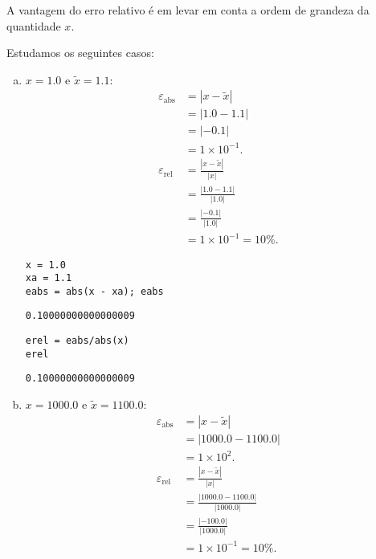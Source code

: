 A vantagem do erro relativo é em levar em conta a ordem de grandeza da quantidade $x$.

\begin{ex}\label{ex:medidas_de_erros}
  Estudamos os seguintes casos:
  \begin{enumerate}[a)]
  \item $x=1.0$ e $\tilde{x} = 1.1$:
    \begin{align}
      \varepsilon_{\text{abs}} &= |x - \tilde{x}| \\
                        &= |1.0 - 1.1|\\
                        &= |-0.1|\\
                        &= 1\times 10^{-1}.\\
      \varepsilon_{\text{rel}} &= \frac{|x - \tilde{x}|}{|x|} \\
                        &= \frac{|1.0-1.1|}{|1.0|}\\
                        &= \frac{|-0.1|}{|1.0|}\\
                        &= 1\times 10^{-1} = 10\%.
    \end{align}
    
\begin{lstlisting}
x = 1.0
xa = 1.1
eabs = abs(x - xa); eabs
\end{lstlisting}

\begin{verbatim}
0.10000000000000009
\end{verbatim}

\begin{lstlisting}
erel = eabs/abs(x)
erel
\end{lstlisting}

\begin{verbatim}
0.10000000000000009
\end{verbatim}

    
  \item $x=1000.0$ e $\tilde{x} = 1100.0$:
    \begin{align}
      \varepsilon_{\text{abs}} &= |x - \tilde{x}| \\
                        &= |1000.0 - 1100.0|\\
                        &= 1\times 10^2.\\
      \varepsilon_{\text{rel}} &= \frac{|x - \tilde{x}|}{|x|} \\
                        &= \frac{|1000.0 - 1100.0|}{|1000.0|}\\
                        &= \frac{|-100.0|}{|1000.0|}\\
                        &= 1\times 10^{-1} = 10\%.
    \end{align}
    

\end{enumerate}
\end{ex}

